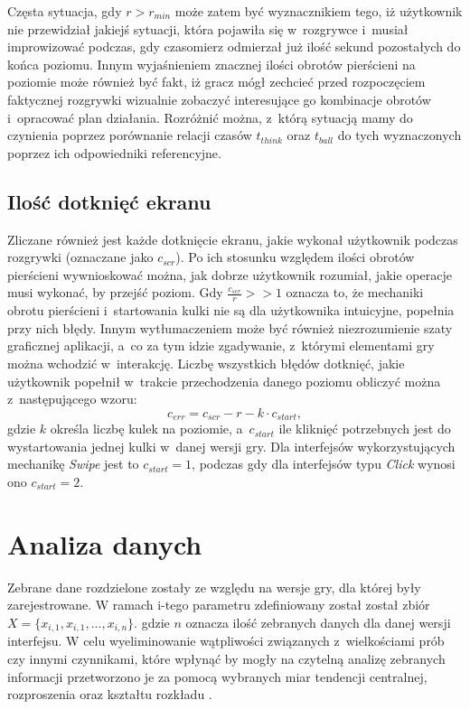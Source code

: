 \documentclass[a4paper,12pt,numbers=noenddot]{report}
\begin{document}
Częsta sytuacja, gdy $r > r_{min}$  może zatem być wyznacznikiem tego, iż użytkownik nie przewidział jakiejś sytuacji, która pojawiła się w~rozgrywce i~musiał improwizować podczas, gdy czasomierz odmierzał już ilość sekund pozostałych do końca poziomu. Innym wyjaśnieniem znacznej ilości obrotów pierścieni na poziomie może również być fakt, iż gracz mógł zechcieć przed rozpoczęciem faktycznej rozgrywki wizualnie zobaczyć interesujące go kombinacje obrotów i~opracować plan działania. Rozróżnić można, z~którą sytuacją mamy do czynienia poprzez porównanie relacji czasów $t_{think}$ oraz $t_{ball}$ do tych wyznaczonych poprzez ich odpowiedniki referencyjne.
	\subsection{Ilość dotknięć ekranu}
Zliczane również jest każde dotknięcie ekranu, jakie wykonał użytkownik podczas rozgrywki (oznaczane jako $c_{scr}$). Po ich stosunku względem ilości obrotów pierścieni wywnioskować można, jak dobrze użytkownik rozumiał, jakie operacje musi wykonać, by przejść poziom. Gdy $\frac{c_{scr}}{r} >> 1$ oznacza to, że mechaniki obrotu pierścieni i~startowania kulki nie są dla użytkownika intuicyjne, popełnia przy nich błędy. Innym wytłumaczeniem może być również niezrozumienie szaty graficznej aplikacji, a~co za tym idzie zgadywanie, z~którymi elementami gry można wchodzić w~interakcję. Liczbę wszystkich błędów dotknięć, jakie użytkownik popełnił w~trakcie przechodzenia danego poziomu obliczyć można z~następującego wzoru:
\begin{equation}
\label{eq_errors}
c_{err} = c_{scr} - r - k \cdot c_{start},
\end{equation}
gdzie $k$ określa liczbę kulek na poziomie, a~$c_{start}$ ile kliknięć potrzebnych jest do wystartowania jednej kulki w~danej wersji gry. Dla interfejsów wykorzystujących mechanikę \textit{Swipe} jest to $c_{start} = 1$, podczas gdy dla interfejsów typu \textit{Click} wynosi ono $c_{start} = 2$.
\section{Analiza danych}
Zebrane dane rozdzielone zostały ze względu na wersje gry, dla której były zarejestrowane. W ramach i-tego parametru zdefiniowany został został zbiór $X = \{x_{i,1},x_{i,1},..., x_{i,n}\}$. gdzie $n$ oznacza ilość zebranych danych dla danej wersji interfejsu. W celu wyeliminowanie wątpliwości związanych z~wielkościami prób czy innymi czynnikami, które wpłynąć by mogły na czytelną analizę zebranych informacji przetworzono je za pomocą wybranych miar tendencji centralnej, rozproszenia oraz kształtu rozkładu \cite{online_Statistics}.
\end{document}
